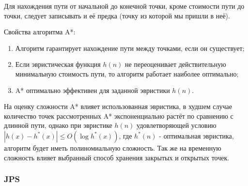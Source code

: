 Для нахождения пути от начальной до конечной точки, кроме стоимости пути до точки, следует записывать и её предка (точку из которой мы пришли в неё).


Свойства алгоритма A*:

\begin{enumerate}
    \item Алгоритм гарантирует нахождение пути между точками, если он существует;
    \item Если эвристическая функция $h(n)$ не переоценивает действительную минимальную стоимость пути, то алгоритм работает наиболее оптимально;
    \item A* оптимально эффективен для заданной эвристики $h(n)$.
\end{enumerate}

На оценку сложности A* влияет использованная эвристика, в худшем случае количество точек рассмотренных A* экспоненциально растёт по сравнению с длинной пути, однако при эвристике $h(n)$ удовлетворяющей условию $|h(x) - h^*(x)| \leq O(\log h^*(x))$, где $h^*(n)$ - оптимальная эвристика, алгоритм будет иметь полиномиальную сложность. Так же на временную сложность влияет выбранный способ хранения закрытых и открытых точек.

\subsubsection{JPS}

